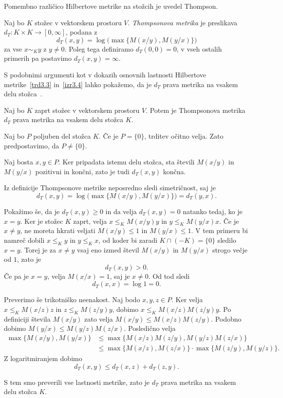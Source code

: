 \documentclass[mat2, tisk]{fmfdelo}
\begin{document}
Pomembno različico Hilbertove metrike na stožcih je uvedel Thompson.

\begin{definicija}
Naj bo $K$ stožec v vektorskem prostoru $V$.
\emph{Thompsonova metrika} je preslikava
$d_T:K\times K\longrightarrow[0,\infty]$, podana z
\[
d_T(x,y)=\log\bigl(\max\{M(x/y),M(y/x)\}\bigr)
\]
za vse $x\sim_K y$ z $y\neq0$.
Poleg tega definiramo $d_T(0,0)=0$, v vseh ostalih primerih pa
postavimo $d_T(x,y)=\infty$.
\end{definicija}

S podobnimi argumenti kot v dokazih osnovnih lastnosti Hilbertove
metrike~\ref{trd3.3} in~\ref{izr3.4} lahko pokažemo, da je $d_T$ prava metrika na vsakem delu
stožca~\cite{Thompson1963}.

\begin{trditev}\label{trd:thompson_metrika}
Naj bo $K$ zaprt stožec v vektorskem prostoru $V$.
Potem je Thompsonova metrika $d_T$ prava metrika
na vsakem delu stožca $K$.
\end{trditev}

\begin{dokaz}
Naj bo $P$ poljuben del stožca $K$.
Če je $P=\{0\}$, trditev očitno velja.
Zato predpostavimo, da $P\neq\{0\}$.

Naj bosta $x,y\in P$. Ker pripadata istemu delu
stožca, sta števili $M(x/y)$ in $M(y/x)$
pozitivni in končni, zato je tudi $d_T(x,y)$
končna.

Iz definicije Thompsonove metrike neposredno
sledi simetričnost, saj je
\[
d_T(x,y)
=\log\bigl(\max\{M(x/y),M(y/x)\}\bigr)
=d_T(y,x).
\]

Pokažimo še, da je $d_T(x,y)\geq 0$ in da velja
$d_T(x,y)=0$ natanko tedaj, ko je $x=y$.
Ker je stožec $K$ zaprt, velja
$x\leq_K M(x/y)y$ in 
$y\leq_K M(y/x)x$.
Če je $x\neq y$, ne moreta hkrati veljati
$M(x/y)\leq 1$ in $M(y/x)\leq 1$.
V tem primeru bi namreč dobili
$x\leq_K y$ in 
$y\leq_K x$,
od koder bi zaradi $K\cap(-K)=\{0\}$
sledilo $x=y$.
Torej je za $x\neq y$ vsaj eno izmed števil
$M(x/y)$ in $M(y/x)$ strogo večje od $1$,
zato je
\[
d_T(x,y)>0.
\]
Če pa je $x=y$, velja $M(x/x)=1$, saj je
$x\neq 0$.
Od tod sledi
\[
d_T(x,x)=\log 1=0.
\]

Preverimo še trikotniško neenakost.
Naj bodo $x,y,z\in P$. Ker velja
$x\leq_K M(x/z)z$ in 
$z\leq_K M(z/y)y$,
dobimo $x\leq_K M(x/z)M(z/y)y$.
Po definiciji števila $M(x/y)$ zato velja
$M(x/y)\leq M(x/z)M(z/y)$.
Podobno dobimo $M(y/x)\leq M(y/z)M(z/x)$.
Posledično velja
\[
\begin{aligned}
\max\{M(x/y),M(y/x)\}
&\leq
\max\{M(x/z)M(z/y),M(y/z)M(z/x)\}\\
&\leq
\max\{M(x/z),M(z/x)\} \cdot\max\{M(z/y),M(y/z)\}.
\end{aligned}
\]
Z logaritmiranjem dobimo
\[
d_T(x,y)\leq d_T(x,z)+d_T(z,y).
\]

S tem smo preverili vse lastnosti metrike,
zato je $d_T$ prava metrika na vsakem delu
stožca $K$.
\end{dokaz}
\end{document}
